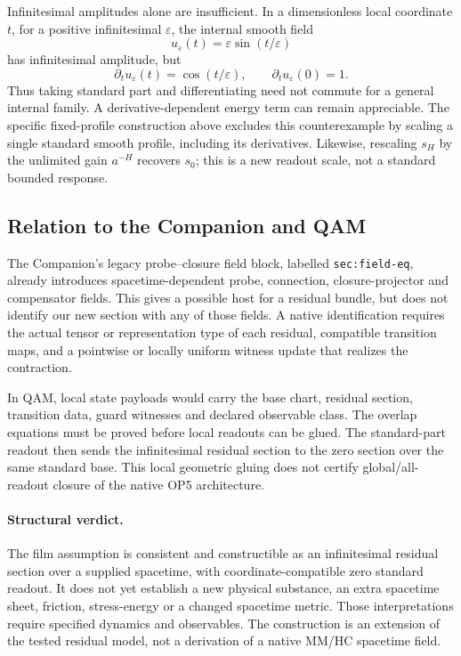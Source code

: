 \documentclass[11pt,a4paper]{article}
\begin{document}
Infinitesimal amplitudes alone are insufficient. In a dimensionless local
coordinate $t$, for a positive infinitesimal $\varepsilon$, the internal
smooth field
\[
u_\varepsilon(t)=\varepsilon\sin(t/\varepsilon)
\]
has infinitesimal amplitude, but
\[
\partial_t u_\varepsilon(t)=\cos(t/\varepsilon),\qquad
\partial_t u_\varepsilon(0)=1.
\]
Thus taking standard part and differentiating need not commute for a
general internal family. A derivative-dependent energy term can remain
appreciable. The specific fixed-profile construction above excludes this
counterexample by scaling a single standard smooth profile, including its
derivatives. Likewise, rescaling $s_H$ by the unlimited gain $a^{-H}$
recovers $s_0$; this is a new readout scale, not a standard bounded response.

\subsection{Relation to the Companion and QAM}
The Companion's legacy probe--closure field block, labelled
\texttt{sec:field-eq}, already introduces spacetime-dependent probe,
connection, closure-projector and compensator fields. This gives a possible
host for a residual bundle, but does not identify our new section with any
of those fields. A native identification requires the actual tensor or
representation type of each residual, compatible transition maps, and a
pointwise or locally uniform witness update that realizes the contraction.

In QAM, local state payloads would carry the base chart, residual section,
transition data, guard witnesses and declared observable class. The overlap
equations must be proved before local readouts can be glued. The standard-part
readout then sends the infinitesimal residual section to the zero section
over the same standard base. This local geometric gluing does not certify
global/all-readout closure of the native OP5 architecture.

\paragraph{Structural verdict.}
The film assumption is consistent and constructible as an infinitesimal
residual section over a supplied spacetime, with coordinate-compatible zero
standard readout. It does not yet establish a new physical substance, an
extra spacetime sheet, friction, stress-energy or a changed spacetime metric.
Those interpretations require specified dynamics and observables. The
construction is an extension of the tested residual model, not a derivation
of a native MM/HC spacetime field.
\end{document}
